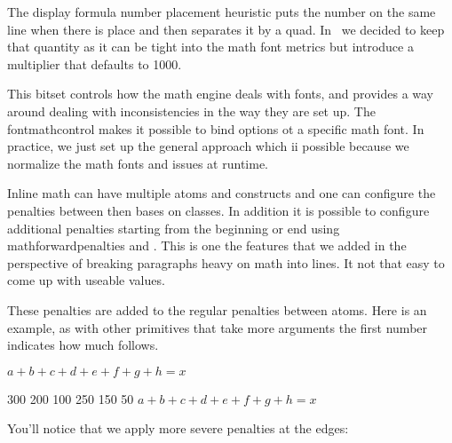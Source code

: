 \startnewprimitive[title={\prm {matheqnogapstep}}]

The display formula number placement heuristic puts the number on the same line
when there is place and then separates it by a quad. In \LUATEX\ we decided to
keep that quantity as it can be tight into the math font metrics but introduce
a multiplier  that defaults to 1000.

\stopnewprimitive

\startnewprimitive[title={\prm {mathfontcontrol}}]

This bitset controls how the math engine deals with fonts, and provides a way
around dealing with inconsistencies in the way they are set up. The \prm
{fontmathcontrol} makes it possible to bind options ot a specific math font. In
practice, we just set up the general approach which ii possible because we
normalize the math fonts and  issues at runtime.


\stopnewprimitive

\startnewprimitive[title={\prm {mathforwardpenalties}}]

Inline math can have multiple atoms and constructs and one can configure the
penalties between then bases on classes. In addition it is possible to configure
additional penalties starting from the beginning or end using \prm
{mathforwardpenalties} and . This is one the features
that we added in the perspective of breaking paragraphs heavy on math into lines.
It not that easy to come up with useable values.

These penalties are added to the regular penalties between atoms. Here is an
example, as with other primitives that take more arguments the first number
indicates how much follows.

\startbuffer
$ a + b + c + d + e + f + g + h = x $\par
{} 300 200 100
 250 150  50
$ a + b + c + d + e + f + g + h = x $\par
\stopbuffer

\typebuffer

You'll notice that we apply more severe penalties at the edges:

{\showmakeup[penalty]\multiply\glyphscale\plustwo \getbuffer}


\stopnewprimitive

\startnewprimitive[title={\prm {mathgluemode}}]

